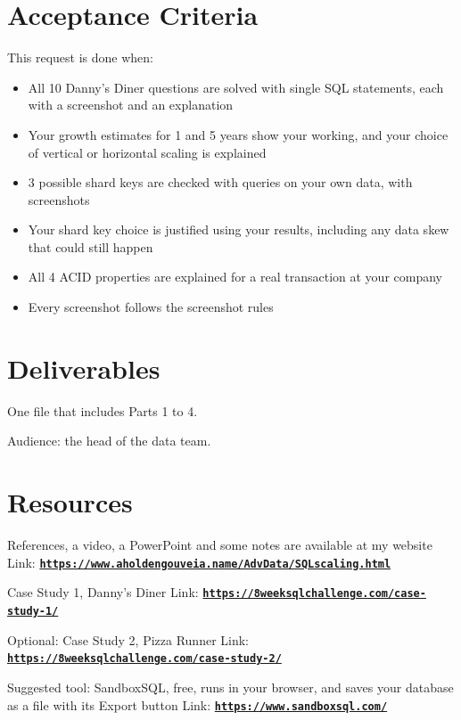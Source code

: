 \documentclass[12pt]{article}
\begin{document}
\section*{Acceptance Criteria}
This request is done when:
\begin{itemize}
    \item All 10 Danny's Diner questions are solved with single SQL statements, each with a screenshot and an explanation
    \item Your growth estimates for 1 and 5 years show your working, and your choice of vertical or horizontal scaling is explained
    \item 3 possible shard keys are checked with queries on your own data, with screenshots
    \item Your shard key choice is justified using your results, including any data skew that could still happen
    \item All 4 ACID properties are explained for a real transaction at your company
    \item Every screenshot follows the screenshot rules
\end{itemize}

\section*{Deliverables}
One file that includes Parts 1 to 4.

Audience: the head of the data team.

\section*{Resources}
References, a video, a PowerPoint and some notes are available at my website
Link: \href{https://www.aholdengouveia.name/AdvData/SQLscaling.html}{\textbf{\nolinkurl{https://www.aholdengouveia.name/AdvData/SQLscaling.html}}}

Case Study 1, Danny's Diner
Link: \href{https://8weeksqlchallenge.com/case-study-1/}{\textbf{\nolinkurl{https://8weeksqlchallenge.com/case-study-1/}}}

Optional: Case Study 2, Pizza Runner
Link: \href{https://8weeksqlchallenge.com/case-study-2/}{\textbf{\nolinkurl{https://8weeksqlchallenge.com/case-study-2/}}}

Suggested tool: SandboxSQL, free, runs in your browser, and saves your database as a file with its Export button
Link: \href{https://www.sandboxsql.com/}{\textbf{\nolinkurl{https://www.sandboxsql.com/}}}
\end{document}
